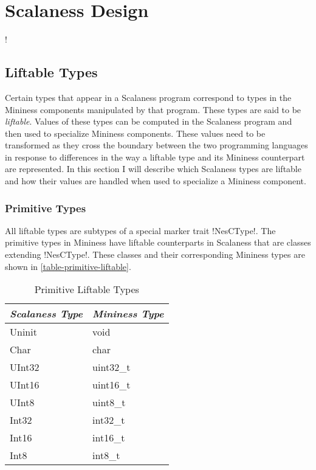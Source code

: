 \chapter{Scalaness Design}
\label{chapter-scalaness-design}

\lstset{language=scalaness}
\lstMakeShortInline!

\section{Liftable Types}
\label{section-liftable-types-design}

Certain types that appear in a Scalaness program correspond to types in the Mininess components
manipulated by that program. These types are said to be \textit{liftable}. Values of these types
can be computed in the Scalaness program and then used to specialize Mininess components. These
values need to be transformed as they cross the boundary between the two programming languages
in response to differences in the way a liftable type and its Mininess counterpart are
represented. In this section I will describe which Scalaness types are liftable and how their
values are handled when used to specialize a Mininess component.

\subsection{Primitive Types}
\label{section-primitive-types-design}

All liftable types are subtypes of a special marker trait !NesCType!. The primitive types in
Mininess have liftable counterparts in Scalaness that are classes extending !NesCType!. These
classes and their corresponding Mininess types are shown in \autoref{table-primitive-liftable}.

\begin{table}
  \centering
  \caption{Primitive Liftable Types}
  \label{table-primitive-liftable}
  \begin{tabular}{|l|l|} \hline
    \textit{Scalaness Type} & \textit{Mininess Type} \\ \hline
    Uninit & void      \\ \hline
    Char   & char      \\ \hline
    UInt32 & uint32\_t \\ \hline
    UInt16 & uint16\_t \\ \hline
    UInt8  & uint8\_t  \\ \hline
    Int32  & int32\_t  \\ \hline
    Int16  & int16\_t  \\ \hline
    Int8   & int8\_t   \\ \hline
  \end{tabular}
\end{table}

